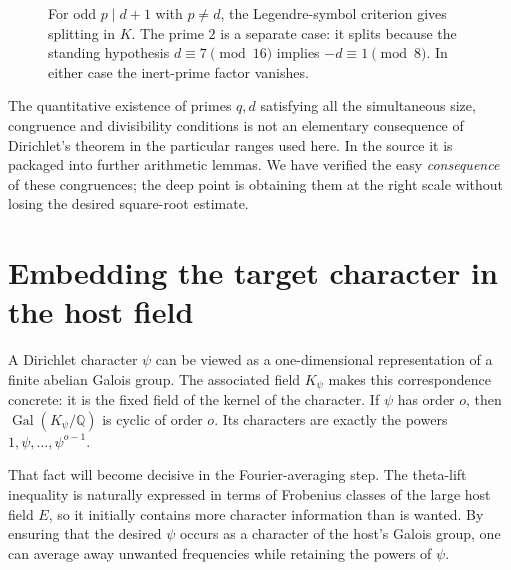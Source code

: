 \documentclass[11pt,openany,oneside]{scrbook}
\theoremstyle{definition}
\theoremstyle{remark}
\newcommand{\QQ}{\mathbb Q}
\begin{document}
\begin{figure}[ht]
\centering
{}
\caption{For odd $p\mid d+1$ with $p\ne d$, the Legendre-symbol criterion gives splitting in $K$. The prime $2$ is a separate case: it splits because the standing hypothesis $d\equiv7\pmod{16}$ implies $-d\equiv1\pmod8$. In either case the inert-prime factor vanishes.}
\end{figure}

The quantitative existence of primes $q,d$ satisfying all the simultaneous size, congruence and divisibility conditions is not an elementary consequence of Dirichlet's theorem in the particular ranges used here. In the source it is packaged into further arithmetic lemmas. We have verified the easy \emph{consequence} of these congruences; the deep point is obtaining them at the right scale without losing the desired square-root estimate.

\section{Embedding the target character in the host field}

A Dirichlet character $\psi$ can be viewed as a one-dimensional representation of a finite abelian Galois group. The associated field $K_\psi$ makes this correspondence concrete: it is the fixed field of the kernel of the character. If $\psi$ has order $o$, then $\operatorname{Gal}(K_\psi/\QQ)$ is cyclic of order $o$. Its characters are exactly the powers $1,\psi,\ldots,\psi^{o-1}$.

That fact will become decisive in the Fourier-averaging step. The theta-lift inequality is naturally expressed in terms of Frobenius classes of the large host field $E$, so it initially contains more character information than is wanted. By ensuring that the desired $\psi$ occurs as a character of the host's Galois group, one can average away unwanted frequencies while retaining the powers of $\psi$.
\end{document}
